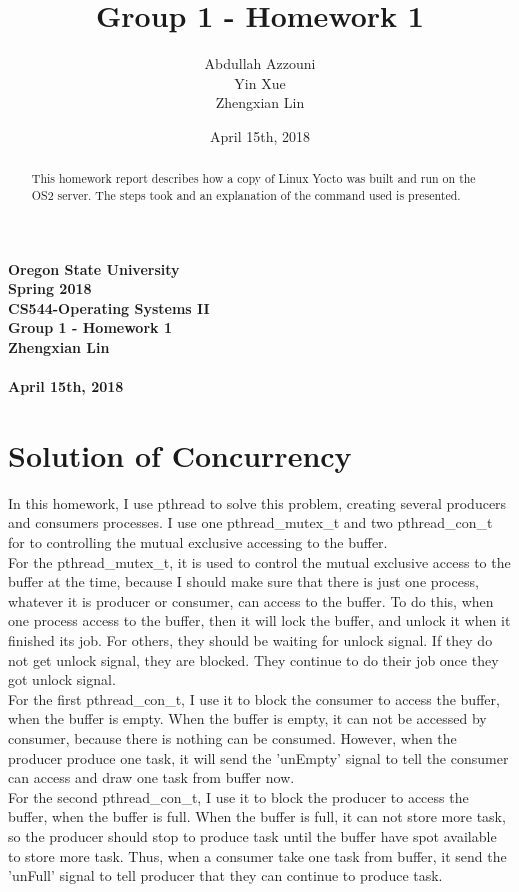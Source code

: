 \documentclass[10pt,letterpaper,onecolumn]{IEEEtran}
\title{Group 1 - Homework 1}
\date{April 15th, 2018}
\author{Abdullah Azzouni\\ Yin Xue\\  Zhengxian Lin}
\begin{document}
\begin{titlepage}
	\begin{center}
		\vspace*{0.5cm}
		\large
		\textbf{Oregon State University\\Spring 2018\\}
		\textbf{CS544-Operating Systems II\\}
		\vspace*{4cm}
		\Huge
		\textbf{Group 1 - Homework 1\\}
		\vspace{2cm}
		\normalsize
		\textbf{Zhengxian Lin\\}
		\textbf{\\April 15th, 2018\\}
	\end{center}
	\bigskip \bigskip \bigskip
	\large
	\begin{abstract}
		This homework report describes how a copy of Linux Yocto
		was built and run on the OS2 server. The steps took and an
		explanation of the command used is presented.
	\end{abstract}
\end{titlepage}
\section{Solution of Concurrency}
\bigskip
In this homework, I use pthread to solve this problem, creating several producers and consumers processes. I use one pthread\_mutex\_t and two pthread\_con\_t for to controlling the mutual exclusive accessing to the buffer.\\
For the pthread\_mutex\_t, it is used to control the mutual exclusive access to the buffer at the time, because I should make sure that there is just one process, whatever it is producer or consumer, can access to the buffer. To do this, when one process access to the buffer, then it will lock the buffer, and unlock it when it finished its job. For others, they should be waiting for unlock signal. If they do not get unlock signal, they are blocked. They continue to do their job once they got unlock signal.\\
For the first pthread\_con\_t, I use it to block the consumer to access the buffer, when the buffer is empty. When the buffer is empty, it can not be accessed by consumer, because there is nothing can be consumed. However, when the producer produce one task, it will send the 'unEmpty' signal to tell the consumer can access and draw one task from buffer now.\\
For the second pthread\_con\_t, I use it to block the producer to access the buffer, when the buffer is full. When the buffer is full, it can not store more task, so the producer should stop to produce task until the buffer have spot available to store more task. Thus, when a consumer take one task from buffer, it send the 'unFull' signal to tell producer that they can continue to produce task.\\
\end{document}
